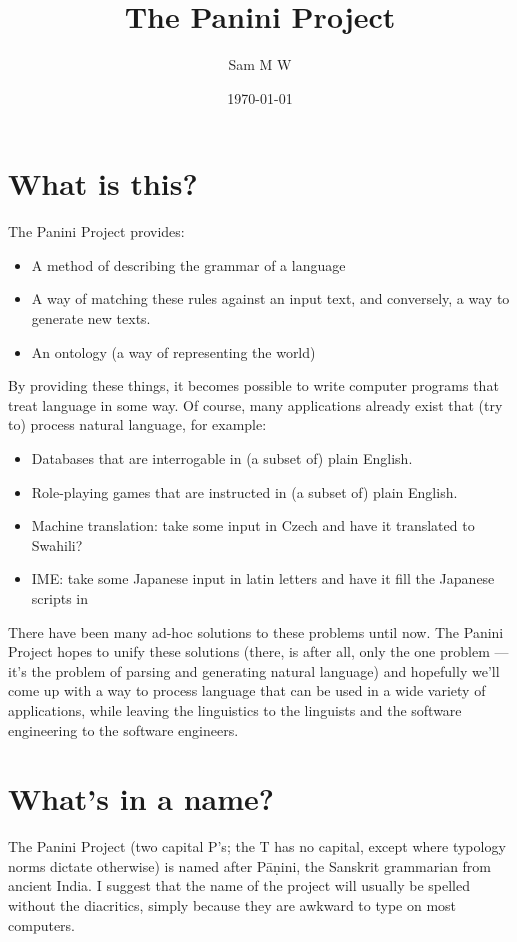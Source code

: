 \documentclass{article}
\title{The Panini Project}
\author{Sam M W}
\date{\today}
\begin{document}
\label{start}

\maketitle

\section{What is this?}

The Panini Project provides:
\begin{itemize}
	\item A method of describing the grammar of a language
	\item A way of matching these rules against an input text, and conversely, a way to generate new texts.
	\item An ontology (a way of representing the world)
\end{itemize}
By providing these things, it becomes possible to write computer programs that treat language in some way. Of course, many 
applications already exist that (try to) process natural language, for example:
\begin{itemize}
	\item Databases that are interrogable in (a subset of) plain English.
	\item Role-playing games that are instructed in (a subset of) plain English.
	\item Machine translation: take some input in Czech and have it translated to Swahili?
	\item IME: take some Japanese input in latin letters and have it fill the Japanese scripts in
\end{itemize}

There have been many ad-hoc solutions to these problems until now. The Panini Project hopes to unify these solutions (there, is 
after all, only the one problem --- it's the problem of parsing and generating natural language) and hopefully we'll come up with a
way to process language that can be used in a wide variety of applications, while leaving the linguistics to the linguists and the
software engineering to the software engineers.

\section{What's in a name?}
The Panini Project (two capital P's; the T has no capital, except where typology norms dictate otherwise) is named after 
P\=a\d{n}ini, the Sanskrit grammarian from ancient India. I suggest that the name of the project will usually be spelled without the
diacritics, simply because they are awkward to type on most computers.
\end{document}
